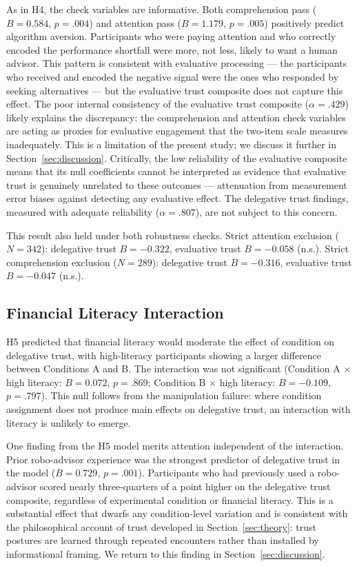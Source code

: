 As in H4, the check variables are informative. Both comprehension pass ($B = 0.584$, $p = .004$) and attention pass ($B = 1.179$, $p = .005$) positively predict algorithm aversion. Participants who were paying attention and who correctly encoded the performance shortfall were more, not less, likely to want a human advisor. This pattern is consistent with evaluative processing --- the participants who received and encoded the negative signal were the ones who responded by seeking alternatives --- but the evaluative trust composite does not capture this effect. The poor internal consistency of the evaluative trust composite ($\alpha = .429$) likely explains the discrepancy: the comprehension and attention check variables are acting as proxies for evaluative engagement that the two-item scale measures inadequately. This is a limitation of the present study; we discuss it further in Section~\ref{sec:discussion}. Critically, the low reliability of the evaluative composite means that its null coefficients cannot be interpreted as evidence that evaluative trust is genuinely unrelated to these outcomes --- attenuation from measurement error biases against detecting any evaluative effect. The delegative trust findings, measured with adequate reliability ($\alpha = .807$), are not subject to this concern.

This result also held under both robustness checks. Strict attention exclusion ($N = 342$): delegative trust $B = -0.322$, evaluative trust $B = -0.058$ (n.s.). Strict comprehension exclusion ($N = 289$): delegative trust $B = -0.316$, evaluative trust $B = -0.047$ (n.s.).

\subsection{Financial Literacy Interaction}

H5 predicted that financial literacy would moderate the effect of condition on delegative trust, with high-literacy participants showing a larger difference between Conditions A and B. The interaction was not significant (Condition A $\times$ high literacy: $B = 0.072$, $p = .869$; Condition B $\times$ high literacy: $B = -0.109$, $p = .797$). This null follows from the manipulation failure: where condition assignment does not produce main effects on delegative trust, an interaction with literacy is unlikely to emerge.

One finding from the H5 model merits attention independent of the interaction. Prior robo-advisor experience was the strongest predictor of delegative trust in the model ($B = 0.729$, $p = .001$). Participants who had previously used a robo-advisor scored nearly three-quarters of a point higher on the delegative trust composite, regardless of experimental condition or financial literacy. This is a substantial effect that dwarfs any condition-level variation and is consistent with the philosophical account of trust developed in Section~\ref{sec:theory}: trust postures are learned through repeated encounters rather than installed by informational framing. We return to this finding in Section~\ref{sec:discussion}.

